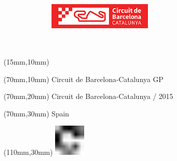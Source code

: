 \null\newpage
\begin{textblock*}{50mm}(15mm,10mm)%
\includegraphics[width=50mm]{LG/BAC.png}
\end{textblock*}
\begin{textblock*}{130mm}(70mm,10mm)%
{\fontsize{20}{20}\selectfont Circuit de Barcelona-Catalunya GP}\\
\end{textblock*}
\begin{textblock*}{120mm}(70mm,20mm)%
{\fontsize{16}{16}\selectfont Circuit de Barcelona-Catalunya / 2015}\\
\end{textblock*}
\begin{textblock*}{120mm}(70mm,30mm)%
{\fontsize{12}{12}\selectfont Spain}
\end{textblock*}
\begin{textblock*}{30mm}(110mm,30mm)%
\centering
\includegraphics[height=15mm]{icons/fa-rotate-right.pdf}
\end{textblock*}
